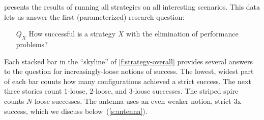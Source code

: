  presents the results of running all strategies on all
interesting scenarios.
This data lets us answer the first (parameterized) research question:

\begin{itemize}
  \item[$Q_X$] How successful is a strategy $X$ with the elimination of
    performance problems?
\end{itemize}

Each stacked bar in the ``skyline'' of \cref{f:strategy-overall} provides
several answers to the question for increasingly-loose notions of success.
The lowest, widest part of each bar counts how many configurations
achieved a strict success.
The next three stories count $1$-loose, $2$-loose, and $3$-loose successes.
The striped spire counts $N$-loose successes.
The antenna uses an even weaker notion, strict 3x success, which we discuss below~(\cref{s:antenna}).

